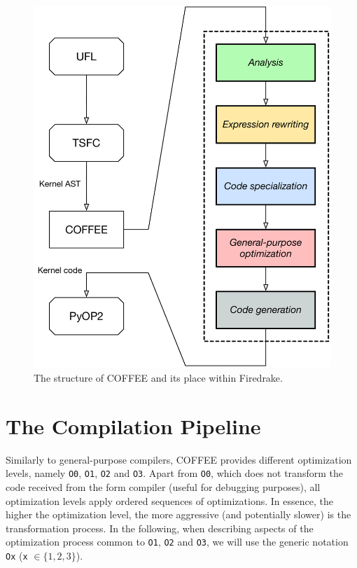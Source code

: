 \begin{figure}
\centering
\includegraphics[scale=0.50]{coffee/pictures/coffee-pipeline.pdf}
\caption{The structure of COFFEE and its place within Firedrake.}
\label{fig:coffee-pipeline}
\end{figure}

\section{The Compilation Pipeline}
\label{sec:coffee:pipeline}
Similarly to general-purpose compilers, COFFEE provides different optimization levels, namely \texttt{O0}, \texttt{O1}, \texttt{O2} and \texttt{O3}. Apart from \texttt{O0}, which does not transform the code received from the form compiler (useful for debugging purposes), all optimization levels apply ordered sequences of optimizations. In essence, the higher the optimization level, the more aggressive (and potentially slower) is the transformation process. In the following, when describing aspects of the optimization process common to \texttt{O1}, \texttt{O2} and \texttt{O3}, we will use the generic notation \texttt{Ox} (\texttt{x} $\in \lbrace 1, 2, 3\rbrace$).

